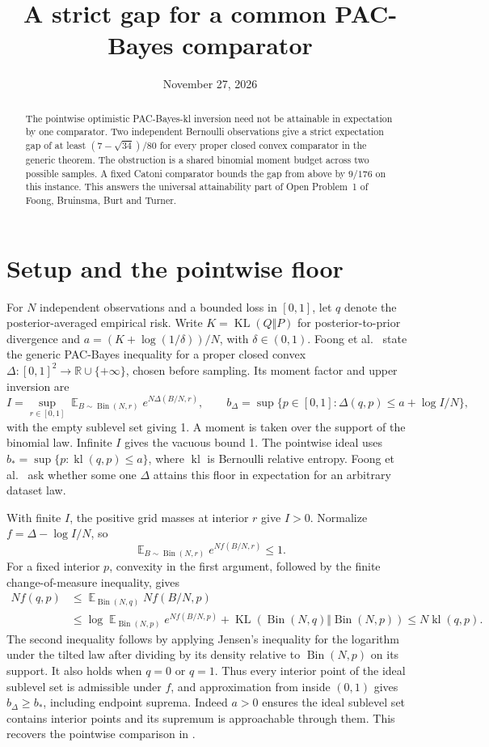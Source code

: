 \documentclass[11pt]{amsart}
\title{A strict gap for a common PAC-Bayes comparator}
\date{November 27, 2026}
\newcommand{\kl}{\operatorname{kl}}
\newcommand{\KL}{\operatorname{KL}}
\newcommand{\Bin}{\operatorname{Bin}}
\newcommand{\E}{\operatorname{\mathbb E}}
\begin{document}
\begin{abstract}
The pointwise optimistic PAC-Bayes-kl inversion need not be
attainable in expectation by one comparator. Two independent
Bernoulli observations give a strict expectation gap of at least
\((7-\sqrt{34})/80\) for every proper closed convex comparator in
the generic theorem. The obstruction is a shared binomial moment
budget across two possible samples. A fixed Catoni comparator
bounds the gap from above by \(9/176\) on this instance. This
answers the universal attainability part of Open Problem~1 of
Foong, Bruinsma, Burt and Turner.
\end{abstract}
\maketitle

\section{Setup and the pointwise floor}
For \(N\) independent observations and a bounded loss in \([0,1]\),
let \(q\) denote the posterior-averaged empirical risk. Write
\(K=\KL(Q\Vert P)\) for posterior-to-prior divergence and
\(a=(K+\log(1/\delta))/N\), with \(\delta\in(0,1)\).
Foong et al.\ \cite[Theorem~3 and Eq.~(6)]{foong} state the
generic PAC-Bayes inequality for a proper closed convex
\(\Delta:[0,1]^2\to\mathbb R\cup\{+\infty\}\), chosen before
sampling. Its moment factor and upper inversion are
\[
 I=\sup_{r\in[0,1]}\E_{B\sim\Bin(N,r)} e^{N\Delta(B/N,r)},
 \qquad b_\Delta=\sup\{p\in[0,1]:\Delta(q,p)\le a+\log I/N\},
\]
with the empty sublevel set giving 1. A moment is taken over the
support of the binomial law. Infinite \(I\) gives the vacuous
bound 1. The pointwise ideal uses \(b_*=\sup\{p:\kl(q,p)\le a\}\),
where \(\kl\) is Bernoulli relative entropy. Foong et al.\
\cite[Open Problem~1]{foong} ask whether some one \(\Delta\)
attains this floor in expectation for an arbitrary dataset law.

With finite \(I\), the positive grid masses at interior \(r\)
give \(I>0\). Normalize \(f=\Delta-\log I/N\), so
\[
            \E_{B\sim\Bin(N,r)} e^{Nf(B/N,r)}\le1.
\]
For a fixed interior \(p\), convexity in the first argument, followed
by the finite change-of-measure inequality, gives
\[
\begin{split}
 N f(q,p)&\le \E_{\Bin(N,q)} Nf(B/N,p)\\
          &\le\log\E_{\Bin(N,p)} e^{Nf(B/N,p)}
                   +\KL(\Bin(N,q)\Vert\Bin(N,p))
          \le N\kl(q,p).
\end{split}
\]
The second inequality follows by applying Jensen's inequality for
the logarithm under the tilted law after dividing by its density
relative to \(\Bin(N,p)\) on its support. It also holds when
\(q=0\) or \(q=1\). Thus every interior point of the ideal
sublevel set is admissible under \(f\), and approximation from
inside \((0,1)\) gives \(b_\Delta\ge b_*\), including endpoint
suprema. Indeed \(a>0\) ensures the ideal sublevel set contains
interior points and its supremum is approachable through them.
This recovers the pointwise comparison in \cite[Remark~2]{foong}.
\end{document}
